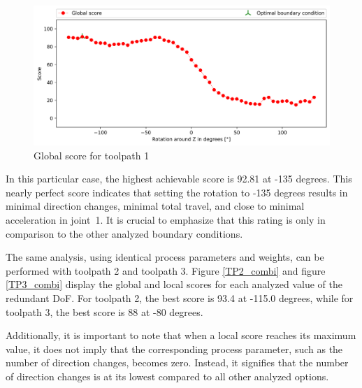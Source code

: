 \begin{figure}[H]
	\centerline{\includegraphics[width=1\textwidth]{figures/best_c_1.png}}
	\caption{Global score for toolpath 1}
	\label{GS1}
\end{figure}
In this particular case, the highest achievable score is 92.81 at -135 degrees. This nearly perfect score indicates that setting the rotation to -135 degrees results in minimal direction changes, minimal total travel, and close to minimal acceleration in joint~1. It is crucial to emphasize that this rating is only in comparison to the other analyzed boundary conditions.


The same analysis, using identical process parameters and weights, can be performed with toolpath 2 and toolpath 3. Figure \ref{TP2_combi} and figure \ref{TP3_combi} display the global and local scores for each analyzed value of the redundant \acrshort{DoF}. For toolpath 2, the best score is 93.4 at -115.0 degrees, while for toolpath 3, the best score is 88 at -80 degrees.

Additionally, it is important to note that when a local score reaches its maximum value, it does not imply that the corresponding process parameter, such as the number of direction changes, becomes zero. Instead, it signifies that the number of direction changes is at its lowest compared to all other analyzed options.
\newpage

